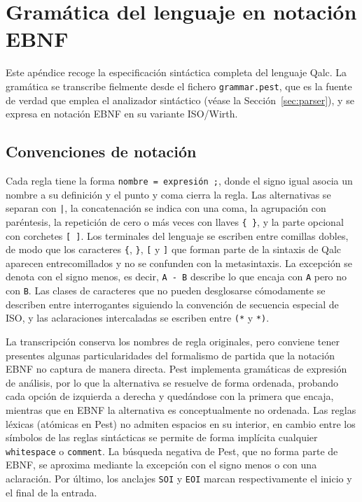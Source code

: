 \chapter{Gramática del lenguaje en notación EBNF}
\label{ch:gramatica-ebnf}

Este apéndice recoge la especificación sintáctica completa del lenguaje Qalc. La gramática se transcribe fielmente desde el fichero \lstinline|grammar.pest|, que es la fuente de verdad que emplea el analizador sintáctico (véase la Sección~\ref{sec:parser}), y se expresa en notación EBNF en su variante ISO/Wirth.

\section{Convenciones de notación}
\label{sec:ebnf-convenciones}

Cada regla tiene la forma \lstinline|nombre = expresión ;|, donde el signo igual asocia un nombre a su definición y el punto y coma cierra la regla. Las alternativas se separan con \lstinline{|}, la concatenación se indica con una coma, la agrupación con paréntesis, la repetición de cero o más veces con llaves \lstinline|{ }|, y la parte opcional con corchetes \lstinline|[ ]|. Los terminales del lenguaje se escriben entre comillas dobles, de modo que los caracteres \lstinline|{|, \lstinline|}|, \lstinline|[| y \lstinline|]| que forman parte de la sintaxis de Qalc aparecen entrecomillados y no se confunden con la metasintaxis. La excepción se denota con el signo menos, es decir, \lstinline|A - B| describe lo que encaja con \lstinline|A| pero no con \lstinline|B|. Las clases de caracteres que no pueden desglosarse cómodamente se describen entre interrogantes siguiendo la convención de secuencia especial de ISO, y las aclaraciones intercaladas se escriben entre \lstinline|(*| y \lstinline|*)|.

La transcripción conserva los nombres de regla originales, pero conviene tener presentes algunas particularidades del formalismo de partida que la notación EBNF no captura de manera directa. Pest implementa gramáticas de expresión de análisis, por lo que la alternativa se resuelve de forma ordenada, probando cada opción de izquierda a derecha y quedándose con la primera que encaja, mientras que en EBNF la alternativa es conceptualmente no ordenada. Las reglas léxicas (atómicas en Pest) no admiten espacios en su interior, en cambio entre los símbolos de las reglas sintácticas se permite de forma implícita cualquier \lstinline|whitespace| o \lstinline|comment|. La búsqueda negativa de Pest, que no forma parte de EBNF, se aproxima mediante la excepción con el signo menos o con una aclaración. Por último, los anclajes \lstinline|SOI| y \lstinline|EOI| marcan respectivamente el inicio y el final de la entrada.

